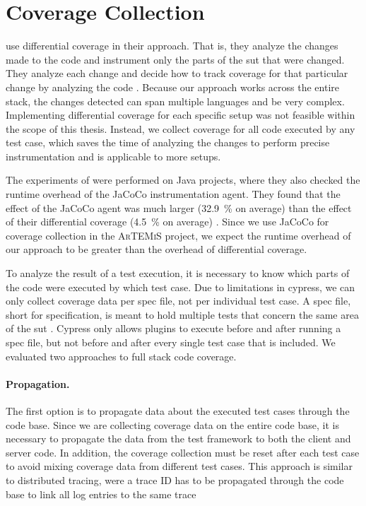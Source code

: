 \section{Coverage Collection}
 use differential coverage in their approach.
That is, they analyze the changes made to the code and instrument only the parts of the \ac{sut} that were changed.
They analyze each change and decide how to track coverage for that particular change by analyzing the code \autocite{bell_deflaker_2018}.
Because our approach works across the entire stack, the changes detected can span multiple languages and be very complex.
Implementing differential coverage for each specific setup was not feasible within the scope of this thesis.
Instead, we collect coverage for all code executed by any test case, which saves the time of analyzing the changes to perform precise instrumentation and is applicable to more setups.

The experiments of \citeauthor*{bell_deflaker_2018} were performed on Java projects, where they also checked the runtime overhead of the JaCoCo instrumentation agent.
They found that the effect of the JaCoCo agent was much larger (\SI{32.9}{\percent} on average) than the effect of their differential coverage (\SI{4.5}{\percent} on average) \autocite{bell_deflaker_2018}.
Since we use JaCoCo for coverage collection in the \textsc{ArTEMiS} project, we expect the runtime overhead of our approach to be greater than the overhead of differential coverage.

To analyze the result of a test execution, it is necessary to know which parts of the code were executed by which test case.
Due to limitations in cypress, we can only collect coverage data per spec file, not per individual test case.
A spec file, short for specification, is meant to hold multiple tests that concern the same area of the \ac{sut} \autocite{noauthor_writing_nodate}.
Cypress only allows plugins to execute before and after running a spec file, but not before and after every single test case that is included.
We evaluated two approaches to full stack code coverage.

\paragraph{Propagation.} The first option is to propagate data about the executed test cases through the code base.
Since we are collecting coverage data on the entire code base, it is necessary to propagate the data from the test framework to both the client and server code.
In addition, the coverage collection must be reset after each test case to avoid mixing coverage data from different test cases.
This approach is similar to distributed tracing, were a trace ID has to be propagated through the code base to link all log entries to the same trace \autocite{noauthor_distributed_nodate}

